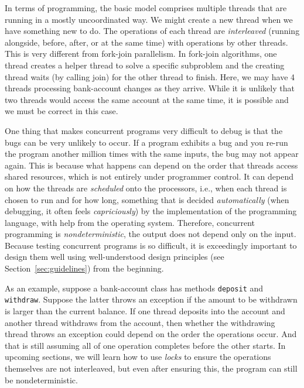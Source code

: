 \documentclass[10pt]{article}
\begin{document}
In terms of programming, the basic model comprises multiple
threads that are running in a mostly uncoordinated way.  We might
create a new thread when we have something new to do.  The operations
of each thread are \emph{interleaved} (running alongside, before,
after, or at the same time) with operations by other threads.  This is
very different from fork-join parallelism.  In fork-join algorithms,
one thread creates a helper thread to solve a specific subproblem and
the creating thread waits (by calling join) for the other thread to
finish.  Here, we may have 4 threads processing bank-account changes
as they arrive.  While it is unlikely that two threads would access
the same account at the same time, it is possible and we must be
correct in this case.

One thing that makes concurrent programs very difficult to debug is
that the bugs can be very unlikely to occur.  If a program exhibits a
bug and you re-run the program another million times with the same
inputs, the bug may not appear again.  This is because what happens
can depend on the order that threads access shared resources, which is
not entirely under programmer control.  It can depend on how the
threads are \emph{scheduled} onto the processors, i.e., when each
thread is chosen to run and for how long, something that is decided
\emph{automatically} (when debugging, it often feels
\emph{capriciously}) by the implementation of the programming
language, with help from the operating system.  Therefore, concurrent
programming is \emph{nondeterministic}, the output does not depend
only on the input.  Because testing concurrent programs is so
difficult, it is exceedingly important to design them well using
well-understood design principles (see Section~\ref{sec:guidelines}) from the
beginning.

As an example, suppose a bank-account class has methods {\tt deposit}
and {\tt withdraw}.  Suppose the latter throws an exception if the
amount to be withdrawn is larger than the current balance.  If one
thread deposits into the account and another thread withdraws from the
account, then whether the withdrawing thread throws an exception
could depend on the order the operations occur.  And that is still
assuming all of one operation completes before the other starts.  In upcoming
sections, we will learn how to use \emph{locks} to ensure the
operations themselves are not interleaved, but even after ensuring
this, the program can still be nondeterministic.
\end{document}
